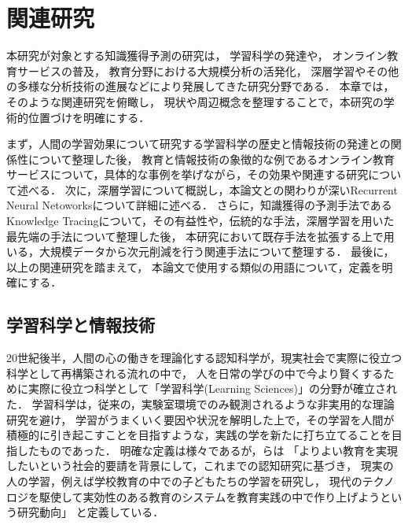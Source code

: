 \chapter{関連研究}
\label{chap:previous}
\fancyhf{}
\rhead{\thepage}
\cfoot{\thepage}


本研究が対象とする知識獲得予測の研究は，
学習科学の発達や，
オンライン教育サービスの普及，
教育分野における大規模分析の活発化，
深層学習やその他の多様な分析技術の進展などにより発展してきた研究分野である．
本章では，そのような関連研究を俯瞰し，
現状や周辺概念を整理することで，本研究の学術的位置づけを明確にする．


まず，人間の学習効果について研究する学習科学の歴史と情報技術の発達との関係性について整理した後，
教育と情報技術の象徴的な例であるオンライン教育サービスについて，具体的な事例を挙げながら，その効果や関連する研究について述べる．
次に，深層学習について概説し，本論文との関わりが深いRecurrent Neural Netoworksについて詳細に述べる．
さらに，知識獲得の予測手法であるKnowledge Tracingについて，その有益性や，伝統的な手法，深層学習を用いた最先端の手法について整理した後，
本研究において既存手法を拡張する上で用いる，大規模データから次元削減を行う関連手法について整理する．
最後に，以上の関連研究を踏まえて，
本論文で使用する類似の用語について，定義を明確にする．


\section{学習科学と情報技術}

20世紀後半，人間の心の働きを理論化する認知科学が，現実社会で実際に役立つ科学として再構築される流れの中で，
人を日常の学びの中で今より賢くするために実際に役立つ科学として「学習科学(Learning Sciences)」の分野が確立された\cite{白水始2014学習科学の新展開}．
学習科学は，従来の，実験室環境でのみ観測されるような非実用的な理論研究を避け，
学習がうまくいく要因や状況を解明した上で，その学習を人間が積極的に引き起こすことを目指すような，実践の学を新たに打ち立てることを目指したものであった．
明確な定義は様々であるが，\cite{三宅なほみ2002学習環境のデザイン実験}らは
「よりよい教育を実現したいという社会的要請を背景にして，これまでの認知研究に基づき，
現実の人の学習，例えば学校教育の中での子どもたちの学習を研究し，
現代のテクノロジを駆使して実効性のある教育のシステムを教育実践の中で作り上げようという研究動向」
と定義している．


